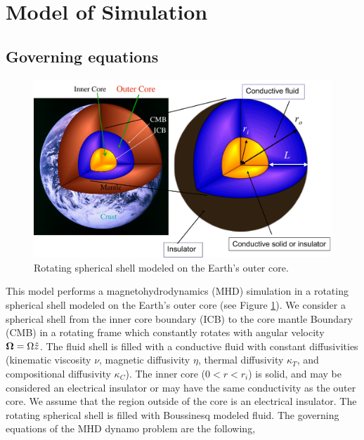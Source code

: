 \section{Model of Simulation}
\subsection{Governing equations}
%
\begin{figure}[htbp]
\begin{center}
\includegraphics*[width=130mm]{images/Spherical_shell}
\end{center}
\caption{Rotating spherical shell modeled on the Earth's outer core.}
\label{fig:shell}
\end{figure}
%
This model performs a magnetohydrodynamics (MHD) simulation in a rotating spherical shell modeled on the Earth's outer core (see Figure \ref{fig:shell}). We consider a spherical shell from the inner core boundary (ICB) to the core mantle Boundary (CMB) in a rotating frame which constantly rotates with angular velocity $\mbox{\boldmath$\Omega$} = \Omega \hat{z}$. The fluid shell is filled with a conductive fluid with constant diffusivities (kinematic viscosity $\nu$, magnetic diffusivity $\eta$, thermal diffusivity $\kappa_{T}$, and compositional diffusivity $\kappa_{C}$). The inner core ($0 < r < r_{i}$) is solid, and may be considered an electrical insulator  or may have the same conductivity as the outer core. We assume that the region outside of the core is an electrical insulator. The rotating spherical shell is filled with Boussinesq modeled fluid. The governing equations of the MHD dynamo problem are the following,
%
